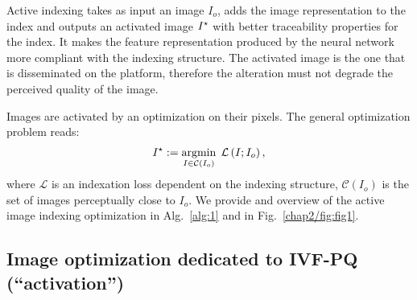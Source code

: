 Active indexing takes as input an image $I_o$, adds the image representation to the index and outputs an activated image $I^\star$ with better traceability properties for the index.
It makes the feature representation produced by the neural network more compliant with the indexing structure. %
The activated image is the one that is disseminated on the platform, therefore the alteration must not degrade the perceived quality of the image.

Images are activated by an optimization on their pixels. 
The general optimization problem reads:
\vspace*{-1em}
\begin{align}
    I^\star := \mathop{\mathrm{argmin}}_{I \in \mathcal{C}(I_o)} 
    \; \mathcal{L}\left(I;I_o\right),
    \label{eq:active_image}
\end{align}
where $\mathcal{L}$ is an indexation loss dependent on the indexing structure, $\mathcal{C}(I_o)$ is the set of images perceptually close to $I_o$.
We provide and overview of the active image indexing optimization in Alg.~\ref{alg:1} and in Fig.~\ref{chap2/fig:fig1}.

\begin{wrapfigure}{R}{0.45\textwidth}
\vspace{-0.7cm}
\end{wrapfigure}




\subsection{Image optimization dedicated to IVF-PQ (``activation'')}


